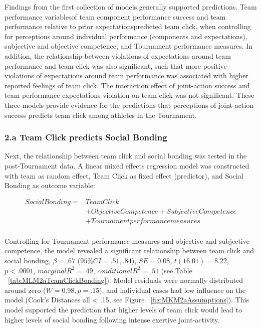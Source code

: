 \documentclass[12pt]{report}
\begin{document}
{Findings from the first collection of models generally supported predictions. Team performance variables\nobreakdashperceptions of team component performance success and team performance relative to prior expectations\nobreakdashsignificantly predicted team click, when controlling for perceptions around individual performance (components and expectations), subjective and objective competence, and Tournament performance measures.  In addition, the relationship between violations of expectations around team performance and team click was also significant, such that more positive violations of expectations around team performance was associated with higher reported feelings of team click.  The interaction effect of joint-action success and team performance expectations violation on team click was not significant.  These three models provide evidence for the predictions that perceptions of joint-action success predicts team click among athletes in the Tournament.


\subsubsection{2.a Team Click predicts Social Bonding}

Next, the relationship between team click and social bonding was tested in the post-Tournament data. A linear mixed effects regression model was constructed with team as random effect, Team Click as fixed effect (predictor), and Social Bonding as outcome variable:

\begin{equation}
  \begin{align*}
    Social Bonding   =& Team Click\\
                    &+ Objective Competence + Subjective Competence  \\
                    &+ Tournament performance measures \\
  \end{align*}
\end{equation}
\bigskip

Controlling for Tournament performance measures and objective and subjective competence, the model revealed a significant relationship between team click and social bonding, $\beta = .67$ ($95\% CI =  .51, .84$), $SE = 0.08$, $t(16.01) = 8.22$, $p < .0001$, $marginal R^2 = .49$, $conditional R^2 = .51$ (see Table ~\ref{tab:MLM2aTeamClickBonding}).  Model residuals were normally distributed around zero ($W = 0.98, p = .15$), and individual cases had low influence on the model (Cook's Distances all < .15, see Figure ~\ref{fig:MKM2aAssumptions}).  This model supported the prediction that higher levels of team click would lead to higher levels of social bonding following intense exertive joint-activity.


}
\end{document}
